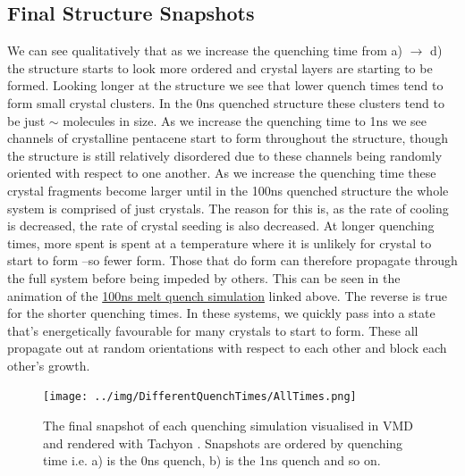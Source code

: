 \subsection{Final Structure Snapshots}
\noindent We can see qualitatively that as we increase the quenching time from a) $\rightarrow$ d) the structure starts to look more ordered and crystal layers are starting to be formed. Looking longer at the structure we see that lower quench times tend to form small crystal clusters. In the 0ns quenched structure these clusters tend to be just $\sim$ molecules in size. As we increase the quenching time to 1ns we see  channels of crystalline pentacene start to form throughout the structure, though the structure is still relatively disordered due to these channels being randomly oriented with respect to one another. As we increase the quenching time these crystal fragments become larger until in the 100ns quenched structure the whole system is comprised of just  crystals. The reason for this is, as the rate of cooling is decreased, the rate of crystal seeding is also decreased. At longer quenching times, more spent is spent at a temperature where it is unlikely for crystal to start to form --so fewer form. Those that do form can therefore propagate through the full system before being impeded by others. This can be seen in the animation of the \href{https://youtu.be/6IQcYErQHVs}{100ns melt quench simulation} linked above. The reverse is true for the shorter quenching times. In these systems, we quickly pass into a state that's energetically favourable for many crystals to start to form. These all propagate out at random orientations with respect to each other and block each other's growth.

\begin{figure}[ht]
	\texttt{[image: ../img/DifferentQuenchTimes/AllTimes.png]}
	\caption{\label{fig:final_snapshots}The final snapshot of each quenching simulation visualised in VMD \cite{VMD} and rendered with Tachyon \cite{Tachyon}. Snapshots are ordered by quenching time i.e. a) is the 0ns quench, b) is the 1ns quench and so on.}
\end{figure}
